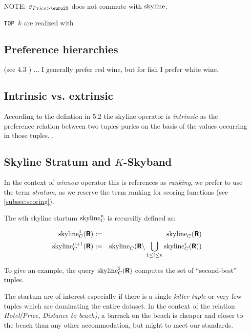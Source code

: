 NOTE: $\sigma_{Price>\textnormal{\euro}20}$ does not commute with $\skyline$.


\texttt{TOP $k$} are realized with 

\subsection{Preference hierarchies}
(see 4.3 \citep{Chomicki2002}) ... I generally prefer red wine, but for fish I prefer white wine.


\subsection{Intrinsic vs. extrinsic}
According to the defintion in 5.2 \citep{Chomicki2002} the skyline operator is \emph{intrinsic} as the preference relation between two tuples purles on the basis of the values occurring in those tuples. .

\subsection{Skyline Stratum and $K$-Skyband}

In the context of \emph{winnow} operator this is references as \emph{ranking}, we prefer to use the term \emph{stratum}, as we reserve the term ranking for scoring functions (see \ref{subsec:scoring}).

The $n$th skyline startum $\skyline_C^n$ is recursifly defined as:

\begin{eqnarray}
\skyline_C^1(\relation{R}) & := & \skyline_C(\relation{R}) \\
\skyline_C^{n+1}(\relation{R}) & := & \skyline_C(\relation{R} \difference \bigunion_{1 \le i \le n} \skyline_C^i(\relation{R}))
\end{eqnarray}

To give an example, the query $\skyline_C^2(\relation{R})$ computes the set of ``second-best'' tuples.

The startum are of interest especially if there is a single
\emph{killer tuple} or very few tuples which are dominating the entire
dataset.  In the context of the relation \emph{Hotel(Price, Distance
to beach)}, a barrack on the beach is cheaper and closer to the beach
than any other accommodation, but might to meet our
standards. 

